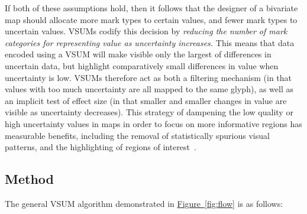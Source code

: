 \documentclass{vgtc}                          %
\newcommand{\figref}[1]{\hyperref[#1]{Figure~\ref*{#1}}}
\begin{document}
If both of these assumptions hold, then it follows that the designer of a bivariate map should allocate more mark types to certain values, and fewer mark types to uncertain values. VSUMs codify this decision by \emph{reducing the number of mark categories for representing value as uncertainty increases.} This means that data encoded using a VSUM will make visible only the largest of differences in uncertain data, but highlight comparatively small differences in value when uncertainty is low. VSUMs therefore act as both a filtering mechanism (in that values with too much uncertainty are all mapped to the same glyph), as well as an implicit test of effect size (in that smaller and smaller changes in value are visible as uncertainty decreases). This strategy of dampening the low quality or high uncertainty values in maps in order to focus on more informative regions has measurable benefits, including the removal of statistically spurious visual patterns, and the highlighting of regions of interest~\cite{correll2017surprise}.

\subsection{Method}

\flowFig

The general VSUM algorithm demonstrated in \figref{fig:flow} is as follows:
\end{document}
